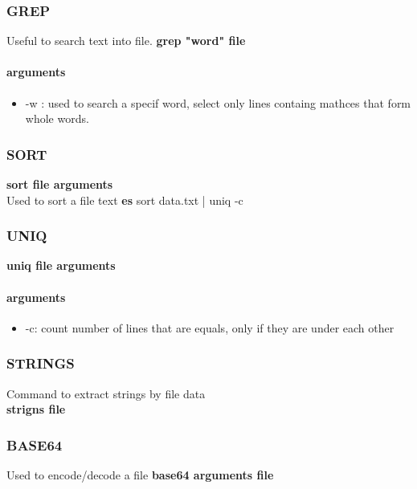 \documentclass{article}
\begin{document}
                \subsubsection{GREP}
                    Useful to search text into file.
                    \textbf{grep "word" file}
                    \paragraph{arguments}
                    \begin{itemize}
        
                        \item -w : used to search a specif word, select only lines containg mathces that form whole words. 
                    \end{itemize}
                \subsubsection{SORT}
                    \textbf{sort file arguments}\\
                    Used to sort a file text \textbf{es} sort data.txt | uniq -c
                \subsubsection{UNIQ}
                    \textbf{uniq file arguments}\\
                    \paragraph{arguments}   
                    \begin{itemize}
                        \item -c: count number of lines that are equals, only if they are under each other
                    \end{itemize}
                \subsubsection{STRINGS}
                    Command to extract strings by file data\\
                    \textbf{strigns file}
                \subsubsection{BASE64}
                    Used to encode/decode a file
                    \textbf{base64 arguments file}
\end{document}
